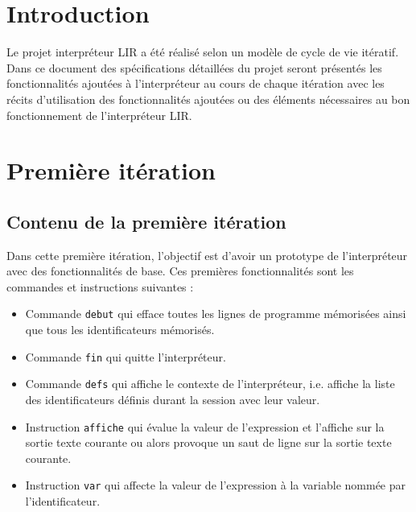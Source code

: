     \chapter*{Introduction}
    \Large
    Le projet interpréteur LIR a été réalisé selon un modèle de cycle
    de vie itératif. Dans ce document des spécifications détaillées du
    projet seront présentés les fonctionnalités ajoutées à l'interpréteur
    au cours de chaque itération avec les récits d'utilisation des
    fonctionnalités ajoutées ou des éléments nécessaires au bon
    fonctionnement de l'interpréteur LIR.


    \large
    \chapter{Première itération}

    \section*{Contenu de la première itération}
    Dans cette première itération, l'objectif est d'avoir un
    prototype de l'interpréteur avec des fonctionnalités de base.
    Ces premières fonctionnalités sont les commandes et instructions suivantes :
    \begin{itemize}
        \item Commande \verb|debut| qui efface toutes les lignes de
              programme mémorisées ainsi que tous les identificateurs
              mémorisés.
        \item Commande \verb|fin| qui quitte l'interpréteur.
        \item Commande \verb|defs| qui affiche le contexte de
              l'interpréteur, i.e. affiche la liste des identificateurs
              définis durant la session avec leur valeur.
        \item Instruction \verb|affiche| qui évalue la valeur de
              l'expression et l'affiche sur la sortie texte courante ou
              alors provoque un saut de ligne sur la sortie texte
              courante.
        \item Instruction \verb|var| qui affecte la valeur de
              l'expression à la variable nommée par l’identificateur.
    \end{itemize}


    \footnotesize
